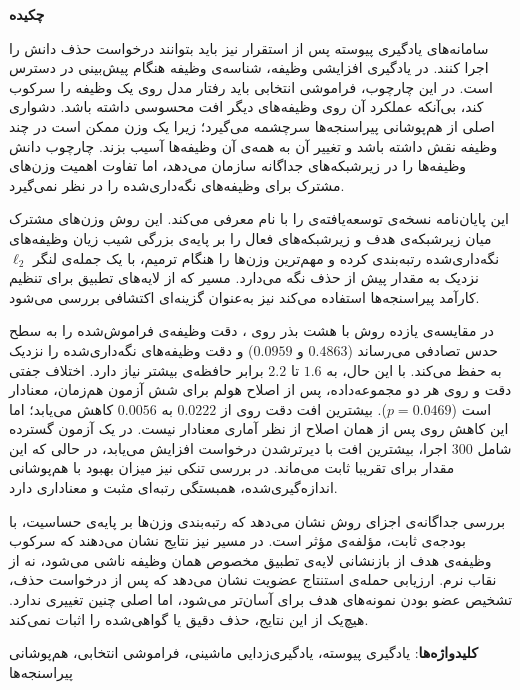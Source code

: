
\begin{center}
\textbf{چکیده}
\end{center}
\noindent
\begingroup
\small
\setlength{\parskip}{0.2\baselineskip}

سامانه‌های {یادگیری پیوسته} پس از استقرار نیز باید بتوانند درخواست حذف دانش را اجرا کنند. در {یادگیری افزایشی وظیفه}، شناسه‌ی وظیفه هنگام پیش‌بینی در دسترس است. در این چارچوب، {فراموشی انتخابی} باید رفتار مدل روی یک وظیفه را سرکوب کند، بی‌آنکه عملکرد آن روی وظیفه‌های دیگر افت محسوسی داشته باشد. دشواری اصلی از {هم‌پوشانی پیراسنجه‌ها} سرچشمه می‌گیرد؛ زیرا یک وزن ممکن است در چند وظیفه نقش داشته باشد و تغییر آن به همه‌ی آن وظیفه‌ها آسیب بزند. چارچوب  دانش وظیفه‌ها را در زیرشبکه‌های جداگانه سازمان می‌دهد، اما تفاوت اهمیت وزن‌های مشترک برای وظیفه‌های نگه‌داری‌شده را در نظر نمی‌گیرد.

این پایان‌نامه نسخه‌ی توسعه‌یافته‌ی  را با نام  معرفی می‌کند. این روش وزن‌های مشترک میان زیرشبکه‌ی هدف و زیرشبکه‌های فعال را بر پایه‌ی بزرگی شیب زیان وظیفه‌های نگه‌داری‌شده رتبه‌بندی کرده و مهم‌ترین وزن‌ها را هنگام ترمیم، با یک جمله‌ی {لنگر} $\ell_2$ نزدیک به مقدار پیش از حذف نگه می‌دارد. مسیر  که از لایه‌های تطبیق برای تنظیم کارآمد پیراسنجه‌ها استفاده می‌کند نیز به‌عنوان گزینه‌ای اکتشافی بررسی می‌شود.

در مقایسه‌ی یازده روش با هشت بذر روی ،  دقت وظیفه‌ی فراموش‌شده را به سطح حدس تصادفی می‌رساند ($0.4863$ و $0.0959$) و دقت وظیفه‌های نگه‌داری‌شده را نزدیک به  حفظ می‌کند. با این حال،  به $1.6$ تا $2.2$ برابر حافظه‌ی بیشتر نیاز دارد. اختلاف جفتی دقت  و  روی هر دو مجموعه‌داده، پس از اصلاح هولم برای شش آزمون هم‌زمان، معنادار است ($p=0.0469$). بیشترین افت دقت روی  از $0.0222$ به $0.0056$ کاهش می‌یابد؛ اما این کاهش روی  پس از همان اصلاح از نظر آماری معنادار نیست. در یک آزمون گسترده شامل $300$ اجرا، بیشترین افت  با دیرترشدن درخواست افزایش می‌یابد، در حالی که این مقدار برای  تقریبا ثابت می‌ماند. در بررسی تنکی نیز میزان بهبود با هم‌پوشانی اندازه‌گیری‌شده، همبستگی رتبه‌ای مثبت و معناداری دارد.

بررسی جداگانه‌ی اجزای روش نشان می‌دهد که رتبه‌بندی وزن‌ها بر پایه‌ی حساسیت، با بودجه‌ی ثابت، مؤلفه‌ی مؤثر  است. در مسیر  نیز نتایج نشان می‌دهند که سرکوب وظیفه‌ی هدف از بازنشانی لایه‌ی تطبیق مخصوص همان وظیفه ناشی می‌شود، نه از {نقاب نرم}. ارزیابی {حمله‌ی استنتاج عضویت} نشان می‌دهد که پس از درخواست حذف، تشخیص عضو بودن نمونه‌های هدف برای  آسان‌تر می‌شود، اما  اصلی چنین تغییری ندارد. هیچ‌یک از این نتایج، حذف دقیق یا گواهی‌شده را اثبات نمی‌کند.

\smallskip
\noindent \textbf{کلیدواژه‌ها}:
یادگیری پیوسته، یادگیری‌زدایی ماشینی، فراموشی انتخابی، هم‌پوشانی پیراسنجه‌ها
\endgroup
\newpage
